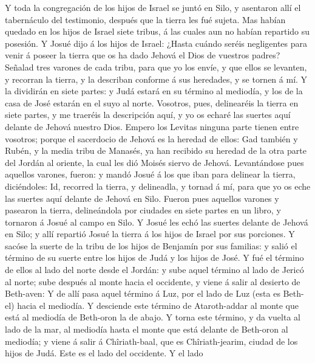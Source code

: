  Y toda la congregación de los hijos de Israel se juntó en
Silo, y asentaron allí el tabernáculo del testimonio, después que la
tierra les fué sujeta.  Mas habían quedado en los hijos de
Israel siete tribus, á las cuales aun no habían repartido su posesión.
 Y Josué dijo á los hijos de Israel: ¿Hasta cuándo seréis
negligentes para venir á poseer la tierra que os ha dado Jehová el Dios
de vuestros padres?  Señalad tres varones de cada tribu,
para que yo los envíe, y que ellos se levanten, y recorran la tierra, y
la describan conforme á sus heredades, y se tornen á mí.  Y
la dividirán en siete partes: y Judá estará en su término al mediodía, y
los de la casa de José estarán en el suyo al norte. 
Vosotros, pues, delinearéis la tierra en siete partes, y me traeréis la
descripción aquí, y yo os echaré las suertes aquí delante de Jehová
nuestro Dios.  Empero los Levitas ninguna parte tienen entre
vosotros; porque el sacerdocio de Jehová es la heredad de ellos: Gad
también y Rubén, y la media tribu de Manasés, ya han recibido su heredad
de la otra parte del Jordán al oriente, la cual les dió Moisés siervo de
Jehová.  Levantándose pues aquellos varones, fueron: y mandó
Josué á los que iban para delinear la tierra, diciéndoles: Id, recorred
la tierra, y delineadla, y tornad á mí, para que yo os eche las suertes
aquí delante de Jehová en Silo.  Fueron pues aquellos
varones y pasearon la tierra, delineándola por ciudades en siete partes
en un libro, y tornaron á Josué al campo en Silo.  Y Josué
les echó las suertes delante de Jehová en Silo; y allí repartió Josué la
tierra á los hijos de Israel por sus porciones.  Y sacóse
la suerte de la tribu de los hijos de Benjamín por sus familias: y salió
el término de su suerte entre los hijos de Judá y los hijos de José.
 Y fué el término de ellos al lado del norte desde el
Jordán: y sube aquel término al lado de Jericó al norte; sube después al
monte hacia el occidente, y viene á salir al desierto de Beth-aven:
 Y de allí pasa aquel término á Luz, por el lado de Luz
(esta es Beth-el) hacia el mediodía. Y desciende este término de
Ataroth-addar al monte que está al mediodía de Beth-oron la de abajo.
 Y torna este término, y da vuelta al lado de la mar, al
mediodía hasta el monte que está delante de Beth-oron al mediodía; y
viene á salir á Chîriath-baal, que es Chîriath-jearim, ciudad de los
hijos de Judá. Este es el lado del occidente.  Y el lado
